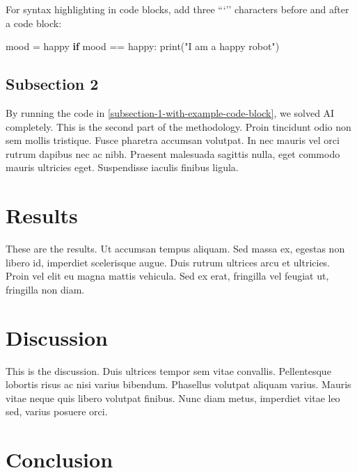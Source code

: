 \documentclass[12pt,a4paper,]{report}
\newenvironment{Shaded}{}{}
\newcommand{\BuiltInTok}[1]{#1}
\newcommand{\ControlFlowTok}[1]{\textcolor[rgb]{0.00,0.44,0.13}{\textbf{#1}}}
\newcommand{\NormalTok}[1]{#1}
\newcommand{\OperatorTok}[1]{\textcolor[rgb]{0.40,0.40,0.40}{#1}}
\newcommand{\StringTok}[1]{\textcolor[rgb]{0.25,0.44,0.63}{#1}}
\begin{document}
For syntax highlighting in code blocks, add three ```'' characters
before and after a code block:

\begin{Shaded}
\begin{Highlighting}[]
\NormalTok{mood }\OperatorTok{=} \StringTok{\textquotesingle{}happy\textquotesingle{}}
\ControlFlowTok{if}\NormalTok{ mood }\OperatorTok{==} \StringTok{\textquotesingle{}happy\textquotesingle{}}\NormalTok{:}
    \BuiltInTok{print}\NormalTok{(}\StringTok{"I am a happy robot"}\NormalTok{)}
\end{Highlighting}
\end{Shaded}

\hypertarget{subsection-2}{%
\subsection{Subsection 2}\label{subsection-2}}

By running the code in \cref{subsection-1-with-example-code-block}, we
solved AI completely. This is the second part of the methodology. Proin
tincidunt odio non sem mollis tristique. Fusce pharetra accumsan
volutpat. In nec mauris vel orci rutrum dapibus nec ac nibh. Praesent
malesuada sagittis nulla, eget commodo mauris ultricies eget.
Suspendisse iaculis finibus ligula.

\hypertarget{results}{%
\section{Results}\label{results}}

These are the results. Ut accumsan tempus aliquam. Sed massa ex, egestas
non libero id, imperdiet scelerisque augue. Duis rutrum ultrices arcu et
ultricies. Proin vel elit eu magna mattis vehicula. Sed ex erat,
fringilla vel feugiat ut, fringilla non diam.

\hypertarget{discussion}{%
\section{Discussion}\label{discussion}}

This is the discussion. Duis ultrices tempor sem vitae convallis.
Pellentesque lobortis risus ac nisi varius bibendum. Phasellus volutpat
aliquam varius. Mauris vitae neque quis libero volutpat finibus. Nunc
diam metus, imperdiet vitae leo sed, varius posuere orci.

\hypertarget{conclusion-1}{%
\section{Conclusion}\label{conclusion-1}}
\end{document}
